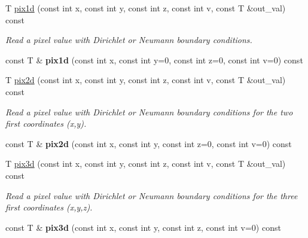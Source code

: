 \begin{DoxyCompactItemize}
\item 
T \hyperlink{structcimg__library_1_1_c_img_ab5ef0ea3ac3076504ff33c098abd27ab}{pix1d} (const int x, const int y, const int z, const int v, const T \&out\-\_\-val) const 
\begin{DoxyCompactList}\small\item\em Read a pixel value with Dirichlet or Neumann boundary conditions. \end{DoxyCompactList}\item 
\hypertarget{structcimg__library_1_1_c_img_a2103b6e3162dd28485c7ded4ce900ca4}{const T \& {\bfseries pix1d} (const int x, const int y=0, const int z=0, const int v=0) const }\label{structcimg__library_1_1_c_img_a2103b6e3162dd28485c7ded4ce900ca4}

\item 
\hypertarget{structcimg__library_1_1_c_img_a04fbd850fa0db4802ee50c2129d2b4bd}{T \hyperlink{structcimg__library_1_1_c_img_a04fbd850fa0db4802ee50c2129d2b4bd}{pix2d} (const int x, const int y, const int z, const int v, const T \&out\-\_\-val) const }\label{structcimg__library_1_1_c_img_a04fbd850fa0db4802ee50c2129d2b4bd}

\begin{DoxyCompactList}\small\item\em Read a pixel value with Dirichlet or Neumann boundary conditions for the two first coordinates ({\ttfamily x},{\ttfamily y}). \end{DoxyCompactList}\item 
\hypertarget{structcimg__library_1_1_c_img_a074bd755ee1a53bd94309b48e7b19b8f}{const T \& {\bfseries pix2d} (const int x, const int y, const int z=0, const int v=0) const }\label{structcimg__library_1_1_c_img_a074bd755ee1a53bd94309b48e7b19b8f}

\item 
\hypertarget{structcimg__library_1_1_c_img_a947e22cc453c54c0a0b0590e64d2095f}{T \hyperlink{structcimg__library_1_1_c_img_a947e22cc453c54c0a0b0590e64d2095f}{pix3d} (const int x, const int y, const int z, const int v, const T \&out\-\_\-val) const }\label{structcimg__library_1_1_c_img_a947e22cc453c54c0a0b0590e64d2095f}

\begin{DoxyCompactList}\small\item\em Read a pixel value with Dirichlet or Neumann boundary conditions for the three first coordinates ({\ttfamily x},{\ttfamily y},{\ttfamily z}). \end{DoxyCompactList}\item 
\hypertarget{structcimg__library_1_1_c_img_af2848105f5f38498da8bb1a049dd4c26}{const T \& {\bfseries pix3d} (const int x, const int y, const int z, const int v=0) const }\label{structcimg__library_1_1_c_img_af2848105f5f38498da8bb1a049dd4c26}


\end{DoxyCompactItemize}
